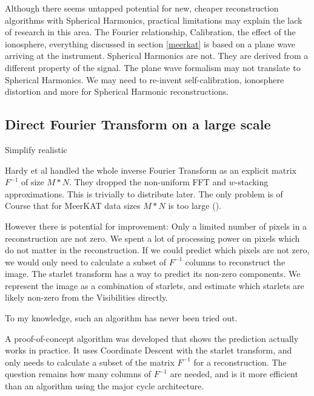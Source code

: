 Although there seems untapped potential for new, cheaper reconstruction algorithms with Spherical Harmonics, practical limitations may explain the lack of research in this area. The Fourier relationship, Calibration, the effect of the ionosphere, everything discussed in section \ref{meerkat} is based on a plane wave arriving at the instrument\cite{thompson1986interferometry, smirnov2011revisiting}. Spherical Harmonics are not. They are derived from a different property of the signal. The plane wave formalism may not translate to Spherical Harmonics. We may need to re-invent self-calibration, ionosphere distortion and more for Spherical Harmonic reconstructions.


\subsection{Direct Fourier Transform on a large scale}

Simplify realistic

Hardy et al\cite{hardy2013direct} handled the whole inverse Fourier Transform as an explicit matrix $F^{-1}$ of size  $M*N$. They dropped the non-uniform FFT and $w$-stacking approximations. This is trivially to distribute later. The only problem is of Course that for MeerKAT data sizes $M*N$ is too large ().

However there is potential for improvement: Only a limited number of pixels in a reconstruction are not zero. We spent a lot of processing power on pixels which do not matter in the reconstruction. If we could predict which pixels are not zero, we would only need to calculate a subset of $F^{-1}$ columns to reconstruct the image. The starlet transform\cite{starck2015starlet} has a way to predict its non-zero components. We represent the image as a combination of starlets, and estimate which starlets are likely non-zero from the Visibilities directly.

To my knowledge, such an algorithm has never been tried out.

A proof-of-concept algorithm was developed that shows the prediction actually works in practice. It uses Coordinate Descent with the starlet transform, and only needs to calculate a subset of the matrix $F^{-1}$ for a reconstruction. The question remains how many columns of $F^{-1}$ are needed, and is it more efficient than an algorithm using the major cycle architecture.